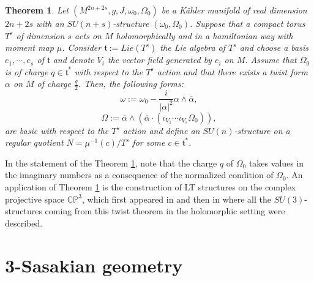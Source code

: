 \documentclass[12pt, reqno]{amsart}
\newtheorem{theo}[Def]{Theorem}
\theoremstyle{definition}
\newcommand{\C}{\mathbb{C}}
\newcommand{\p}{\mathbb{P}}
\newcommand{\tor}{\mathfrak{t}}
\begin{document}
\begin{theo}\cite{peres2026sunstructuresquotienttorusactions}\label{twisttheorem}
    Let $(M^{2n+2s},g,J,\omega_0,\Omega_0)$ be a Kähler manifold of real dimension $2n+2s$ with an $SU(n+s)$-structure $(\omega_0,\Omega_0)$. Suppose that a compact torus $T^s$ of dimension $s$ acts on $M$ holomorphically and in a hamiltonian way with moment map $\mu$. Consider $\tor:=Lie(T^s)$ the Lie algebra of $T^s$ and choose a basis $e_1,\cdots,e_s$ of $\tor$ and denote $V_i$ the vector field generated by $e_i$ on $M$. Assume that $\Omega_0$ is of charge $q\in\tor^*$ with respect to the $T^s$ action and that there exists a twist form $\alpha$ on $M$ of charge $\frac{q}{2}$. Then, the following forms:
    $$\omega:=\omega_0-\frac{i}{|\alpha|^2}\alpha\wedge\overline{\alpha},$$ $$\Omega:=\overline{\alpha}\wedge(\overline{\alpha}\cdot(\iota_{V_1}\cdots\iota_{V_s}\Omega_0)),$$ are basic with respect to the $T^s$ action and define an $SU(n)$-structure on a regular quotient $N=\mu^{-1}(c)/T^s$ for some $c\in\tor^*$.
\end{theo}
\indent In the statement of the Theorem \ref{twisttheorem}, note that the charge $q$ of $\Omega_0$ takes values in the imaginary numbers as a consequence of the normalized condition of $\Omega_0$. An application of Theorem \ref{twisttheorem} is the construction of LT structures on the complex projective space $\C\p^3$, which first appeared in \cite{Tomasiello_2008,Koerber_2008} and then in \cite{peres2026sunstructuresquotienttorusactions} where all the $SU(3)$-structures coming from this twist theorem in the holomorphic setting were described.
\section{3-Sasakian geometry}\label{3}
\end{document}
